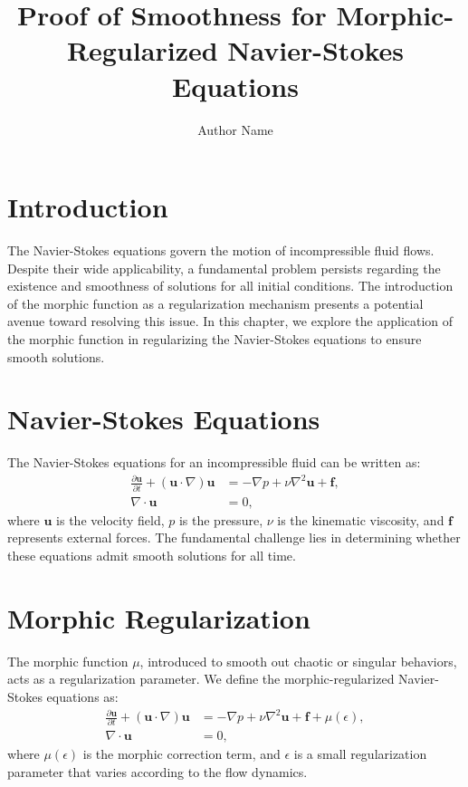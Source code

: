 \documentclass{article}
\title{Proof of Smoothness for Morphic-Regularized Navier-Stokes Equations}
\author{Author Name}
\begin{document}
\maketitle

\section{Introduction}
The Navier-Stokes equations govern the motion of incompressible fluid flows. Despite their wide applicability, a fundamental problem persists regarding the existence and smoothness of solutions for all initial conditions. The introduction of the morphic function as a regularization mechanism presents a potential avenue toward resolving this issue. In this chapter, we explore the application of the morphic function in regularizing the Navier-Stokes equations to ensure smooth solutions.

\section{Navier-Stokes Equations}
The Navier-Stokes equations for an incompressible fluid can be written as:
\begin{align}
    \frac{\partial \mathbf{u}}{\partial t} + (\mathbf{u} \cdot \nabla) \mathbf{u} &= -\nabla p + \nu \nabla^2 \mathbf{u} + \mathbf{f}, \\
    \nabla \cdot \mathbf{u} &= 0,
\end{align}
where $\mathbf{u}$ is the velocity field, $p$ is the pressure, $\nu$ is the kinematic viscosity, and $\mathbf{f}$ represents external forces. The fundamental challenge lies in determining whether these equations admit smooth solutions for all time.

\section{Morphic Regularization}
The morphic function \( \mu \), introduced to smooth out chaotic or singular behaviors, acts as a regularization parameter. We define the morphic-regularized Navier-Stokes equations as:
\begin{align}
    \frac{\partial \mathbf{u}}{\partial t} + (\mathbf{u} \cdot \nabla) \mathbf{u} &= -\nabla p + \nu \nabla^2 \mathbf{u} + \mathbf{f} + \mu(\epsilon), \\
    \nabla \cdot \mathbf{u} &= 0,
\end{align}
where \( \mu(\epsilon) \) is the morphic correction term, and \( \epsilon \) is a small regularization parameter that varies according to the flow dynamics.
\end{document}
